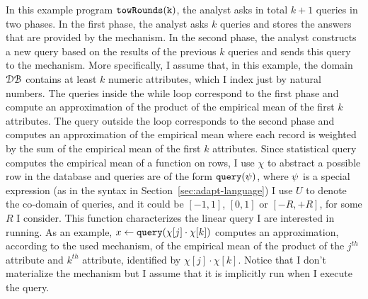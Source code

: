 \begin{example}[twoRounds]
   \label{ex:twoRounds}
    In this example program $\mathtt{towRounds(k)}$, the analyst asks in total $k+1$ queries in two phases.
    In the first phase, the analyst asks $k$ queries and stores the answers that are provided by the mechanism. 
    In the second phase, the analyst constructs a new query based on the results of the previous $k$ queries and sends this query to the mechanism. More specifically, I assume that, in this example, the domain $\mathcal{DB}$ 
    contains at least $k$ numeric attributes, which I index just by natural numbers. 
    The queries inside the while loop correspond to the first phase and compute an approximation of 
    the product of the empirical mean of the first $k$ attributes. 
    The query outside the loop corresponds to the second phase and computes an approximation of the empirical mean where each record is weighted by the sum of the empirical mean of the first $k$ attributes.
    {Since statistical query computes the empirical mean of a function on rows, I use $\chi$ to abstract a possible row in the database and }
    queries are of the form ${\tt query}(\psi)$, where $\psi$ is a special expression 
    (as in the syntax in Section~\ref{sec:adapt-language})
    {
      I use $U$ to denote the co-domain of queries, and it could be $[-1,1]$, $[0,1]$ or $[-R,+R]$, for some $R$ I consider.
      This function characterizes the linear query I are interested in running. 
      As an example, $x \leftarrow {\tt query}(\chi[j] \cdot \chi[k])$ computes an approximation, according to the used mechanism, of the empirical mean of the product of the $j^{th}$ attribute and $k^{th}$ attribute, identified by $\chi[j] \cdot \chi[k]$. Notice that I don't materialize the mechanism but I assume that it is implicitly run when I execute the query. } 


\end{example}
